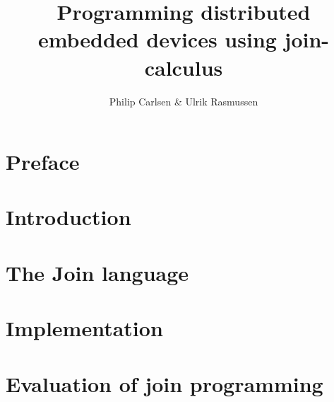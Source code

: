 \documentclass[a4paper, oneside, draft]{memoir}
\title{Programming distributed embedded devices using join-calculus}
\author{Philip Carlsen \& Ulrik Rasmussen}
\begin{document}
\newtheorem{theorem}{Theorem}


\lstset{language=join,
        basicstyle=\small
}

\frontmatter

\maketitle
\begin{abstract}

\end{abstract}

\clearpage
\chapter*{Preface}


\clearpage

\tableofcontents*

\mainmatter

\chapter{Introduction}


\chapter{The Join language}


\chapter{Implementation}


\chapter{Evaluation of join programming}






\end{document}
